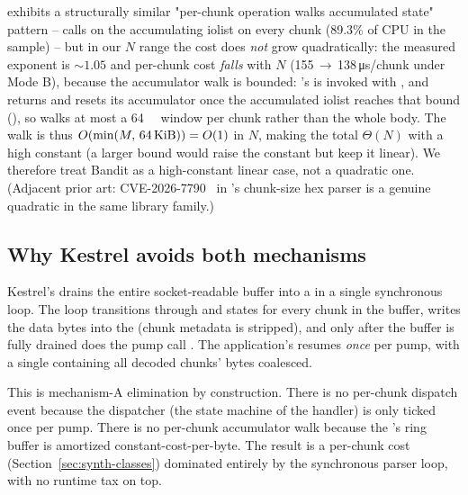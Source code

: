  exhibits a structurally similar "per-chunk
operation walks accumulated state" pattern --
 calls 
on the accumulating iolist on every chunk (89.3\% of CPU in the
 sample) -- but in our $N$ range the cost does
\emph{not} grow quadratically: the measured exponent is
$\sim 1.05$ and per-chunk cost \emph{falls} with $N$
(155\,$\to$\,138\,\si{\micro\second}/chunk under Mode B),
because the accumulator walk is bounded: 's
 is invoked with , and
 returns 
and resets its accumulator once the accumulated iolist reaches
that bound (), so
 walks at most a \SI{64}{\kibi\byte} window
per chunk rather than the whole body. The walk is thus
$O(\min(M,\,\SI{64}{\kibi\byte})) = O(1)$ in $N$, making the total
$\Theta(N)$ with a high constant (a larger  bound
would raise the constant but keep it linear). We therefore treat
Bandit as a high-constant linear case, not a quadratic one.
(Adjacent prior art: CVE-2026-7790~\cite{cve_2026_7790_cowlib}
in 's chunk-size hex parser is a genuine quadratic
in the same library family.)

\subsection{Why Kestrel avoids both mechanisms}
\label{sec:rc-kestrel}

Kestrel's  drains
the entire socket-readable buffer into a 
 in a single synchronous loop. The loop transitions
through  and 
states for every chunk in the buffer, writes the data bytes into
the  (chunk metadata is stripped), and only after the
buffer is fully drained does the pump call .
The application's  resumes
\emph{once} per pump, with a single  containing
all decoded chunks' bytes coalesced.

This is mechanism-A elimination by construction. There is no
per-chunk dispatch event because the dispatcher (the
 state machine of the handler) is only ticked
once per pump. There is no per-chunk accumulator walk because the
's ring buffer is amortized constant-cost-per-byte.
The result is a per-chunk cost (Section~\ref{sec:synth-classes})
dominated entirely by the synchronous parser loop, with no
runtime tax on top.

